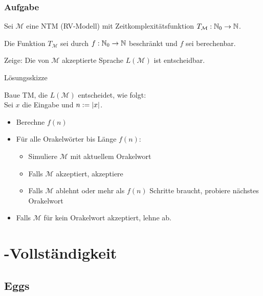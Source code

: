 \begin{frame}
	\frametitle{Aufgabe}
	
	Sei $\mathcal{M}$ eine NTM (RV-Modell) mit Zeitkomplexitätsfunktion $T_\mathcal{M} : \mathbb{N}_0 \rightarrow \mathbb{N}$.
	
	Die Funktion $T_\mathcal{M}$ sei durch $f : \mathbb{N}_0 \rightarrow \mathbb{N}$ beschränkt und $f$ sei berechenbar.
	
	Zeige: Die von $\mathcal{M}$ akzeptierte Sprache $L(\mathcal{M})$ ist entscheidbar.
	
	\invincible \pause
	\begin{block}{Lösungsskizze}
	
	Baue TM, die $L(\mathcal{M})$ entscheidet, wie folgt: \\ Sei $x$ die Eingabe und $n := \left\vert x \right\vert$.
	
	\begin{itemize}
		\item Berechne $f(n)$
		\item Für alle Orakelwörter bis Länge $f(n)$:
		\begin{itemize}
		\item Simuliere $\mathcal{M}$ mit aktuellem Orakelwort
		\item Falls $\mathcal{M}$ akzeptiert, akzeptiere
		\item Falls $\mathcal{M}$ ablehnt oder mehr als $f(n)$ Schritte braucht, probiere nächstes Orakelwort
		\end{itemize}
		\item Falls $\mathcal{M}$ für kein Orakelwort akzeptiert, lehne ab.
	\end{itemize}
	\vincible
	\end{block}
\end{frame}

\section{\classNP{}-Vollständigkeit}
\subsection{Eggs}

